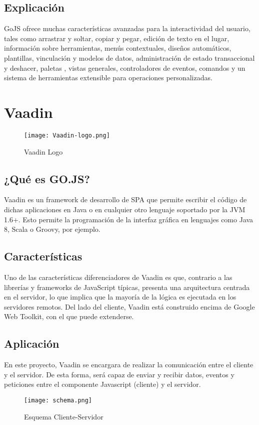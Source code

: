 	 	
	 		\subsection{Explicación}
	 		GoJS ofrece muchas características avanzadas para la interactividad del usuario, tales como arrastrar y soltar, copiar y pegar, edición de texto en el lugar, información sobre herramientas, menús contextuales, diseños automáticos, plantillas, vinculación y modelos de datos, administración de estado transaccional y deshacer, paletas , vistas generales, controladores de eventos, comandos y un sistema de herramientas extensible para operaciones personalizadas.
	 
	 
	 	\section{Vaadin}
	 	
	 		\begin{figure}[H]
	 			\centering
	 			\texttt{[image: Vaadin-logo.png]}
	 			\caption{Vaadin Logo}\label{fig:Vaadin-logo}
	 		\end{figure}
 		
 			\subsection{¿Qué es GO.JS?}
 				Vaadin\cite{vaadin} es un framework de desarrollo de SPA que permite escribir el código de dichas aplicaciones en Java o en cualquier otro lenguaje soportado por la JVM 1.6+. Esto permite la programación de la interfaz gráfica en lenguajes como Java 8, Scala o Groovy, por ejemplo.
 			
 			\subsection{Características}
 				Uno de las características diferenciadores de Vaadin es que, contrario a las librerías y frameworks de JavaScript típicas, presenta una arquitectura centrada en el servidor, lo que implica que la mayoría de la lógica es ejecutada en los servidores remotos. Del lado del cliente, Vaadin está construido encima de Google Web Toolkit, con el que puede extenderse.
 	
 			\subsection{Aplicación}
 				En este proyecto, Vaadin se encargara de realizar la comunicación entre el cliente y el servidor. De esta forma, será capaz de enviar y recibir datos, eventos y peticiones entre el componente Javascript (cliente) y el servidor.
 			
 			
	 			\begin{figure}[H]
	 				\centering
	 				\texttt{[image: schema.png]}
	 				\caption{Esquema Cliente-Servidor}\label{fig:schema}
	 			\end{figure}
 			
	
	

	
	